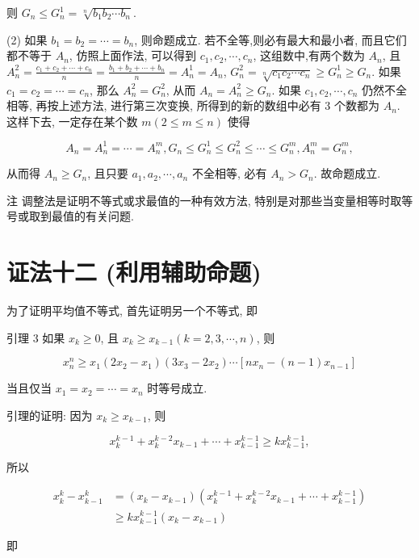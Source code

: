 则 $G_{n} \leqslant G_{n}^{1}=\sqrt[n]{b_{1} b_{2} \cdots b_{n}}$.

(2) 如果 $b_{1}=b_{2}=\cdots=b_{n}$, 则命题成立. 若不全等,则必有最大和最小者, 而且它们都不等于 $A_{n}$, 仿照上面作法, 可以得到 $c_{1}, c_{2}, \cdots, c_{n}$, 这组数中,有两个数为 $A_{n}$, 且 $A_{n}^{2}=\frac{c_{1}+c_{2}+\cdots+c_{n}}{n}=\frac{b_{1}+b_{2}+\cdots+b_{n}}{n}=A_{n}^{1}=A_{n}$, $G_{n}^{2}=\sqrt[n]{c_{1} c_{2} \cdots c_{n}} \geqslant G_{n}^{1} \geqslant G_{n}$. 如果 $c_{1}=c_{2}=\cdots=c_{n}$, 那么 $A_{n}^{2}=G_{n}^{2}$, 从而 $A_{n}=A_{n}^{2} \geqslant G_{n}$. 如果 $c_{1}, c_{2}, \cdots, c_{n}$ 仍然不全相等, 再按上述方法, 进行第三次变换, 所得到的新的数组中必有 3 个数都为 $A_{n}$. 这样下去, 一定存在某个数 $m(2 \leqslant m \leqslant n)$ 使得

$$
A_{n}=A_{n}^{1}=\cdots=A_{n}^{m}, G_{n} \leqslant G_{n}^{1} \leqslant G_{n}^{2} \leqslant \cdots \leqslant G_{n}^{m}, A_{n}^{m}=G_{n}^{m},
$$

从而得 $A_{n} \geqslant G_{n}$, 且只要 $a_{1}, a_{2}, \cdots, a_{n}$ 不全相等, 必有 $A_{n}>G_{n}$. 故命题成立.

注 调整法是证明不等式或求最值的一种有效方法, 特别是对那些当变量相等时取等号或取到最值的有关问题.

\section*{证法十二 (利用辅助命题)}
为了证明平均值不等式, 首先证明另一个不等式, 即

引理 3 如果 $x_{k} \geqslant 0$, 且 $x_{k} \geqslant x_{k-1}(k=2,3, \cdots, n)$, 则

$$
x_{n}^{n} \geqslant x_{1}\left(2 x_{2}-x_{1}\right)\left(3 x_{3}-2 x_{2}\right) \cdots\left[n x_{n}-(n-1) x_{n-1}\right]
$$

当且仅当 $x_{1}=x_{2}=\cdots=x_{n}$ 时等号成立.

引理的证明: 因为 $x_{k} \geqslant x_{k-1}$, 则

$$
x_{k}^{k-1}+x_{k}^{k-2} x_{k-1}+\cdots+x_{k-1}^{k-1} \geqslant k x_{k-1}^{k-1},
$$

所以

$$
\begin{aligned}
x_{k}^{k}-x_{k-1}^{k} & =\left(x_{k}-x_{k-1}\right)\left(x_{k}^{k-1}+x_{k}^{k-2} x_{k-1}+\cdots+x_{k-1}^{k-1}\right) \\
& \geqslant k x_{k-1}^{k-1}\left(x_{k}-x_{k-1}\right)
\end{aligned}
$$

即

